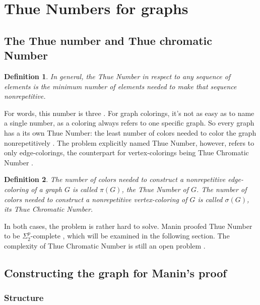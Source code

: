 \documentclass[12pt,a4paper]{article}
\newtheorem{definition}{Definition}
\begin{document}
\newpage

\section{Thue Numbers for graphs}
\subsection{The Thue number and Thue chromatic Number}

\begin{definition}
In general, the Thue Number in respect to any sequence of elements is the minimum number of elements needed to make that sequence nonrepetitive.
\end{definition} 
For words, this number is three \citep{Thue1906}. For graph colorings, it's not as easy as to name a single number, as a coloring always refers to one specific graph. So every graph has a its own Thue Number: the least number of colors needed to color the graph nonrepetitively \citep{Alon2002}. The problem explicitly named Thue Number, however, refers to only edge-colorings, the counterpart for vertex-colorings being Thue Chromatic Number \citep{Schaefer2002}. 
\begin{definition}
The number of colors needed to construct a nonrepetitive edge-coloring of a graph $G$ is called $\pi(G)$, the Thue Number of $G$.
\newline
The number of colors needed to construct a nonrepetitive vertex-coloring of $G$ is called $\sigma(G)$, its Thue Chromatic Number.
\end{definition}
In both cases, the problem is rather hard to solve. Manin proofed Thue Number to be $\Sigma^p_2$-complete \citep{Manin2008}, which will be examined in the following section. The complexity of Thue Chromatic Number is still an open problem \citep{Schaefer2002}.

\subsection{Constructing the graph for Manin's proof}
\subsubsection{Structure}
\end{document}
